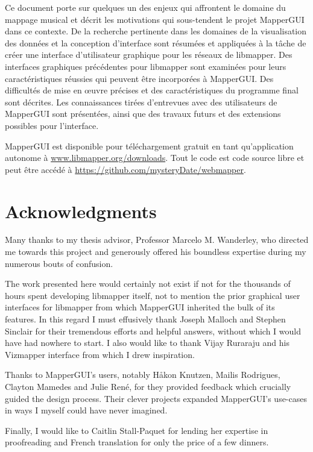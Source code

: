 \documentclass [12pt, letterpaper]{report}
\begin{document}
Ce document porte sur quelques un des enjeux qui affrontent le domaine du mappage musical et d\'ecrit les motivations qui sous-tendent le projet MapperGUI dans ce contexte.
De la recherche pertinente dans les domaines de la visualisation des donn\'ees et la conception d'interface sont r\'esum\'ees et appliqu\'ees \`a la t\^ache de cr\'eer une interface d'utilisateur graphique pour les r\'eseaux de libmapper.
Des interfaces graphiques pr\'ec\'edentes pour libmapper sont examin\'ees pour leurs caract\'eristiques r\'eussies qui peuvent \^etre incorpor\'ees \`a MapperGUI.
Des difficult\'es de mise en \oe uvre pr\'ecises et des caract\'eristiques du programme final sont d\'ecrites.
Les connaissances tir\'ees d’entrevues avec des utilisateurs de MapperGUI sont pr\'esent\'ees, ainsi que des travaux futurs et des extensions possibles pour l'interface.

MapperGUI est disponible pour t\'el\'echargement gratuit en tant qu'application autonome \`a \url{www.libmapper.org/downloads}.
Tout le code est code source libre et peut \^etre acc\'ed\'e \`a \url{https://github.com/mysteryDate/webmapper}.

\pagebreak

\section*{\centering Acknowledgments}

Many thanks to my thesis advisor, Professor Marcelo M. Wanderley, who directed me towards this project and generously offered his boundless expertise during my numerous bouts of confusion.

The work presented here would certainly not exist if not for the thousands of hours spent developing libmapper itself, not to mention the prior graphical user interfaces for libmapper from which MapperGUI inherited the bulk of its features. In this regard I must effusively thank Joseph Malloch and Stephen Sinclair for their tremendous efforts and helpful answers, without which I would have had nowhere to start. I also would like to thank Vijay Ruraraju and his Vizmapper interface from which I drew inspiration.

Thanks to MapperGUI's users, notably H\aa kon Knutzen, Mailis Rodrigues, Clayton Mamedes and Julie Ren\'e, for they provided feedback which crucially guided the design process. Their clever projects expanded MapperGUI's use-cases in ways I myself could have never imagined.

Finally, I would like to Caitlin Stall-Paquet for lending her expertise in proofreading and French translation for only the price of a few dinners.
\end{document}
